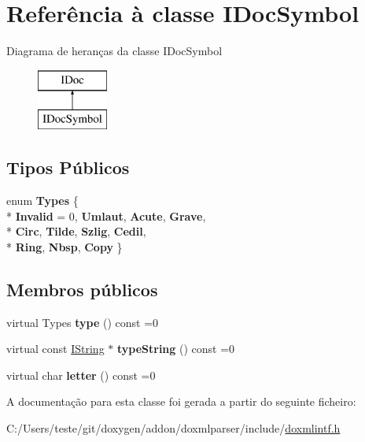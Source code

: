 \hypertarget{class_i_doc_symbol}{\section{Referência à classe I\-Doc\-Symbol}
\label{class_i_doc_symbol}
}
Diagrama de heranças da classe I\-Doc\-Symbol\begin{figure}[H]
\begin{center}
\leavevmode
\includegraphics[height=2.000000cm]{class_i_doc_symbol}
\end{center}
\end{figure}
\subsection*{Tipos Públicos}
\begin{DoxyCompactItemize}
\item 
enum {\bfseries Types} \{ \\*
{\bfseries Invalid} = 0, 
{\bfseries Umlaut}, 
{\bfseries Acute}, 
{\bfseries Grave}, 
\\*
{\bfseries Circ}, 
{\bfseries Tilde}, 
{\bfseries Szlig}, 
{\bfseries Cedil}, 
\\*
{\bfseries Ring}, 
{\bfseries Nbsp}, 
{\bfseries Copy}
 \}
\end{DoxyCompactItemize}
\subsection*{Membros públicos}
\begin{DoxyCompactItemize}
\item 
\hypertarget{class_i_doc_symbol_a07f9c6361a316c0899d7e7338d045ec5}{virtual Types {\bfseries type} () const =0}\label{class_i_doc_symbol_a07f9c6361a316c0899d7e7338d045ec5}

\item 
\hypertarget{class_i_doc_symbol_a6b227ab8a5260d41d25327b442fe90a6}{virtual const \hyperlink{class_i_string}{I\-String} $\ast$ {\bfseries type\-String} () const =0}\label{class_i_doc_symbol_a6b227ab8a5260d41d25327b442fe90a6}

\item 
\hypertarget{class_i_doc_symbol_aaf412e5fddb6553d7a1c7bb57ac8e4c7}{virtual char {\bfseries letter} () const =0}\label{class_i_doc_symbol_aaf412e5fddb6553d7a1c7bb57ac8e4c7}

\end{DoxyCompactItemize}


A documentação para esta classe foi gerada a partir do seguinte ficheiro\-:\begin{DoxyCompactItemize}
\item 
C\-:/\-Users/teste/git/doxygen/addon/doxmlparser/include/\hyperlink{include_2doxmlintf_8h}{doxmlintf.\-h}\end{DoxyCompactItemize}
